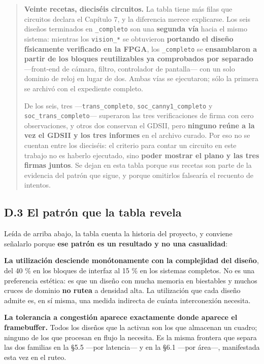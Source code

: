 \begin{quote}
\textbf{Veinte recetas, dieciséis circuitos.} La tabla tiene más filas
que circuitos declara el Capítulo 7, y la diferencia merece explicarse.
Los seis diseños terminados en \texttt{\_completo} son una
\textbf{segunda vía} hacia el mismo sistema: mientras los
\texttt{vision\_*} se obtuvieron \textbf{portando el diseño físicamente
verificado en la FPGA}, los \texttt{\_completo} se \textbf{ensamblaron a
partir de los bloques reutilizables ya comprobados por separado}
---front-end de cámara, filtro, controlador de pantalla--- con un solo
dominio de reloj en lugar de dos. Ambas vías se ejecutaron; sólo la
primera se archivó con el expediente completo.

De los seis, tres ---\texttt{trans\_completo},
\texttt{soc\_canny1\_completo} y \texttt{soc\_trans\_completo}---
superaron las tres verificaciones de firma con cero observaciones, y
otros dos conservan el GDSII, pero \textbf{ninguno reúne a la vez el
GDSII y los tres informes} en el archivo curado. Por eso no se cuentan
entre los dieciséis: el criterio para contar un circuito en este trabajo
no es haberlo ejecutado, sino \textbf{poder mostrar el plano y las tres
firmas juntos}. Se dejan en esta tabla porque sus recetas son parte de
la evidencia del patrón que sigue, y porque omitirlos falsearía el
recuento de intentos.
\end{quote}

\subsection{D.3 El patrón que la tabla
revela}\label{d.3-el-patruxf3n-que-la-tabla-revela}

Leída de arriba abajo, la tabla cuenta la historia del proyecto, y
conviene señalarlo porque \textbf{ese patrón es un resultado y no una
casualidad}:

\textbf{La utilización desciende monótonamente con la complejidad del
diseño}, del 40 \% en los bloques de interfaz al 15 \% en los sistemas
completos. No es una preferencia estética: es que un diseño con mucha
memoria en biestables y muchos cruces de dominio \textbf{no rutea} a
densidad alta. La utilización que cada diseño admite es, en sí misma,
una medida indirecta de cuánta interconexión necesita.

\textbf{La tolerancia a congestión aparece exactamente donde aparece el
framebuffer.} Todos los diseños que la activan son los que almacenan un
cuadro; ninguno de los que procesan en flujo la necesita. Es la misma
frontera que separa las dos familias en la §5.5 ---por latencia--- y en
la §6.1 ---por área---, manifestada esta vez en el ruteo.

